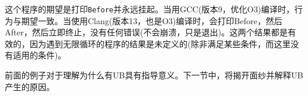 这个程序的期望是打印\texttt{Before}并永远挂起。当用GCC(版本9，优化O3)编译时，行为与期望一致。当使用Clang(版本13，也是O3)编译时，会打印Before，然后After，然后立即终止，没有任何错误(不会崩溃，只是退出)。这两个结果都是有效的，因为遇到无限循环的程序的结果是未定义的(除非满足某些条件，而这里没有适用的条件)。

前面的例子对于理解为什么有UB具有指导意义。下一节中，将揭开面纱并解释UB产生的原因。

























